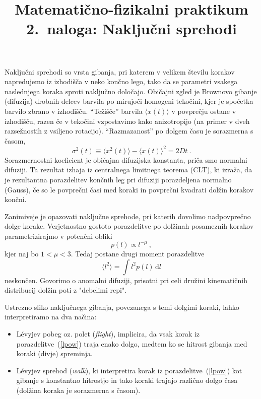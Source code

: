 \documentclass[slovene,11pt,a4paper]{article}
\title{
\sc\large Matematično-fizikalni praktikum \thisyear\\
\bigskip
\bf\Large 2.~naloga: Naključni sprehodi
}
\author{}
\date{}
\newcommand{\dd}{\,\mathrm{d}}
\begin{document}
\maketitle
\vspace{-1cm}

Naključni sprehodi so vrsta gibanja, pri katerem
v velikem številu korakov napredujemo iz izhodišča
v neko končno lego, tako da se parametri vsakega naslednjega
koraka sproti naključno določajo.  Običajni zgled
je Brownovo gibanje (difuzija) drobnih delcev barvila
po mirujoči homogeni tekočini, kjer je spočetka barvilo
zbrano v izhodišču.  ``Težišče'' barvila
$\langle x(t)\rangle$ v povprečju ostane v izhodišču,
razen če v tekočini vzpostavimo kako anizotropijo (na primer
v dveh razsežnostih z vsiljeno rotacijo).  ``Razmazanost''
po dolgem času je sorazmerna s časom,
\begin{equation*}
  \sigma^2(t) \equiv \langle x^2(t)\rangle - \langle x(t)\rangle^2 = 2 D t \>.
\end{equation*}
Sorazmernostni koeficient je običajna difuzijska konstanta,
priča smo normalni difuziji.  Ta rezultat izhaja iz
centralnega limitnega teorema (CLT), ki izraža,
da je rezultantna porazdelitev končnih leg pri difuziji
porazdeljena normalno (Gauss), če so le povprečni časi
med koraki in povprečni kvadrati dolžin korakov končni.

Zanimiveje je opazovati naključne sprehode, pri katerih dovolimo
nadpovprečno dolge korake.  Verjetnostno gostoto porazdelitve
po dolžinah posameznih korakov parametrizirajmo v potenčni obliki
\begin{equation}
p(l) \propto l^{-\mu} \>,
\label{lpow}
\end{equation}
kjer naj bo $1 < \mu < 3$.  Tedaj postane drugi moment porazdelitve
\begin{equation*}
  \langle l^2\rangle = \int l^2 p(l) \dd l
\end{equation*}
neskončen.  Govorimo o anomalni difuziji, prisotni pri celi dru\v zini
kinematičnih distribucij dolžin poti z "debelimi repi".

Ustrezno sliko naključnega gibanja, povezanega s temi dolgimi koraki, lahko
interpretiramo na dva načina:
\begin{itemize}
  \item L\'evyjev pobeg oz. polet ({\sl flight\/}), implicira, da vsak korak iz
  porazdelitve~(\ref{lpow}) traja enako dolgo, medtem ko se hitrost gibanja med koraki (divje) spreminja.
  \item L\'evyjev sprehod ({\sl walk\/}), ki interpretira korak iz porazdelitve~(\ref{lpow}) kot  gibanje s konstantno hitrostjo in
  tako koraki trajajo različno dolgo časa (dolžina koraka je sorazmerna s časom).
\end{itemize}
\end{document}
